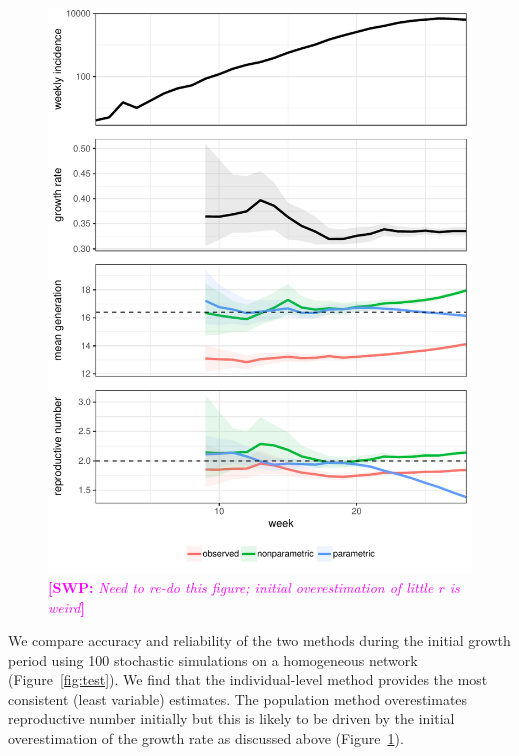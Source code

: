 \documentclass[12pt]{article}
\newcommand{\comment}[3]{\textcolor{#1}{\textbf{[#2: }\textsl{#3}\textbf{]}}}
\newcommand{\swp}[1]{\comment{magenta}{SWP}{#1}}
\begin{document}
\begin{figure}
\includegraphics[width=\textwidth]{../fig/example.pdf}
\caption{\swp{Need to re-do this figure; initial overestimation of little $r$ is weird}}
\label{fig:example}
\end{figure}

We compare accuracy and reliability of the two methods during the initial growth period using 100 stochastic simulations on a homogeneous network (Figure~\ref{fig:test}).
We find that the individual-level method provides the most consistent (least variable) estimates.
The population method overestimates reproductive number initially but this is likely to be driven by the initial overestimation of the growth rate as discussed above (Figure~\ref{fig:example}).
\end{document}
